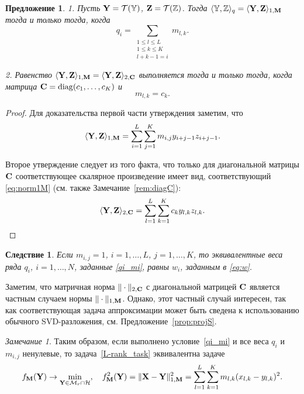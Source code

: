 \documentclass[12pt, specialist, subf,href,colorlinks=true,substylefile = spbu.rtx]{disser}
\newtheorem{corollary}{Следствие}
\newtheorem{proposition}{Предложение}
\theoremstyle{remark}
\newtheorem{remark}{Замечание}
\theoremstyle{definition}
\begin{document}
\begin{proposition}
\label{prop:equiv_tasks}
1. Пусть $\mathbf{Y} = \mathcal{T}(\mathbb{Y})$,  $\mathbf{Z} = \mathcal{T}(\mathbb{Z})$. Тогда $\langle\mathbb{Y},\mathbb{Z}\rangle_q= \langle \mathbf{Y},\mathbf{Z} \rangle_{1,\mathbf{M}}$ тогда и только тогда, когда
\begin{equation}\label{qi_mi}
q_i = \sum_{\substack{1 \le l \le L \\ 1 \le k \le K \\ l+k-1=i}} m_{l,k}.
\end{equation}

2. Равенство $\langle\mathbf{Y},\mathbf{Z}\rangle_{1,\mathbf{M}}= \langle\mathbf{Y},\mathbf{Z}\rangle_{2,\mathbf{C}}$ выполняется тогда и только тогда, когда матрица $\mathbf{C}=\mathop{\mathrm{diag}}(c_1,\ldots,c_K)$ и
\begin{equation}\label{sk_mlk}
m_{l,k}=c_k.
\end{equation}
\end{proposition}
\begin{proof}
Для доказательства первой части утверждения заметим, что
\begin{equation*}
\langle \mathbf{Y}, \mathbf{Z} \rangle_{1,\mathbf{M}} = \sum_{i = 1}^L \sum_{j = 1}^K m_{i,j} y_{i + j - 1} z_{i + j - 1}.
\end{equation*}

Второе утверждение следует из того факта, что только для диагональной матрицы $\mathbf{C}$ соответствующее скалярное произведение имеет вид, соответствующий \eqref{eq:norm1M} (см. также Замечание~\ref{rem:diagC}):
\begin{equation*}
\langle \mathbf{Y}, \mathbf{Z} \rangle_{2,\mathbf{C}} = \sum_{l=1}^L \sum_{k=1}^K c_k y_{l,k} z_{l, k}.
\end{equation*}
\end{proof}

\begin{corollary}
\label{cor:base_weights}
	Если $m_{i,j}=1$, $i =1, \ldots, L$, $j = 1, \ldots, K$, то эквивалентные веса ряда $q_i$, $i = 1, \ldots, N$, заданные \eqref{qi_mi}, равны $w_i$, заданным в \eqref{eq:w}.
\end{corollary}

Заметим, что матричная норма  $\|\cdot\|_{2, \mathbf{C}}$ с диагональной матрицей $\mathbf{C}$ является частным случаем нормы $\|\cdot\|_{1, \mathbf{M}}$. Однако, этот частный случай интересен, так как соответствующая задача аппроксимации может быть сведена к использованию обычного SVD-разложения, см. Предложение~\ref{prop:projS}.

\begin{remark}
\label{rem:2tasks}
Таким образом, если выполнено условие~\eqref{qi_mi} и все веса $q_i$ и $m_{i,j}$ ненулевые, то задача~\eqref{L-rank_task}
эквивалентна задаче
\begin{equation}
	\label{rank_task}
	f_{\mathbf{M}}(\mathbf{Y}) \to \min_{\mathbf{Y} \in \mathcal{M}_r \cap \mathcal{H}}, \quad f^2_{\mathbf{M}}(\mathbf{Y}) = \|\mathbf{X}-\mathbf{Y}\|^2_{1,\mathbf{M}} = \sum_{l = 1}^L \sum_{k=1}^K m_{l,k} (x_{l,k} - y_{l,k})^2.
\end{equation}
\end{remark}
\end{document}
